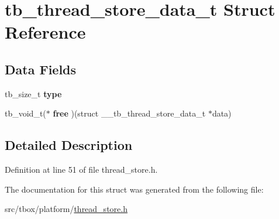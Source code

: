 \hypertarget{structtb__thread__store__data__t}{\section{tb\-\_\-thread\-\_\-store\-\_\-data\-\_\-t Struct Reference}
\label{structtb__thread__store__data__t}
}
\subsection*{Data Fields}
\begin{DoxyCompactItemize}
\item 
\hypertarget{structtb__thread__store__data__t_a196da8ba2ccf9e43fd050e0e6b09c129}{tb\-\_\-size\-\_\-t {\bfseries type}}\label{structtb__thread__store__data__t_a196da8ba2ccf9e43fd050e0e6b09c129}

\item 
\hypertarget{structtb__thread__store__data__t_a93092e9256d3b64b715372dd54261c99}{tb\-\_\-void\-\_\-t($\ast$ {\bfseries free} )(struct \-\_\-\-\_\-tb\-\_\-thread\-\_\-store\-\_\-data\-\_\-t $\ast$data)}\label{structtb__thread__store__data__t_a93092e9256d3b64b715372dd54261c99}

\end{DoxyCompactItemize}


\subsection{Detailed Description}


Definition at line 51 of file thread\-\_\-store.\-h.



The documentation for this struct was generated from the following file\-:\begin{DoxyCompactItemize}
\item 
src/tbox/platform/\hyperlink{thread__store_8h}{thread\-\_\-store.\-h}\end{DoxyCompactItemize}
